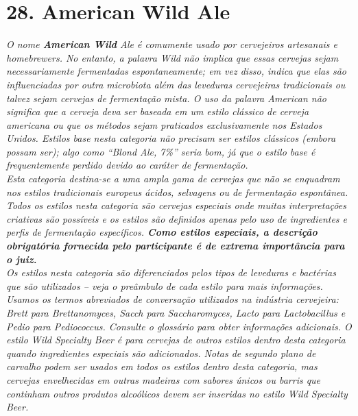 \section*{28. American Wild Ale}
\textit{O nome \textbf{American Wild} Ale é comumente usado por cervejeiros artesanais e homebrewers. No entanto, a palavra Wild não implica que essas cervejas sejam necessariamente fermentadas espontaneamente; em vez disso, indica que elas são influenciadas por outra microbiota além das leveduras cervejeiras tradicionais ou talvez sejam cervejas de fermentação mista. O uso da palavra American não significa que a cerveja deva ser baseada em um estilo clássico de cerveja americana ou que os métodos sejam praticados exclusivamente nos Estados Unidos. Estilos base nesta categoria não precisam ser estilos clássicos (embora possam ser); algo como “Blond Ale, 7\%” seria bom, já que o estilo base é frequentemente perdido devido ao caráter de fermentação.}\\
\textit{Esta categoria destina-se a uma ampla gama de cervejas que não se enquadram nos estilos tradicionais europeus ácidos, selvagens ou de fermentação espontânea. Todos os estilos nesta categoria são cervejas especiais onde muitas interpretações criativas são possíveis e os estilos são definidos apenas pelo uso de ingredientes e perfis de fermentação específicos. \textbf{Como estilos especiais, a descrição obrigatória fornecida pelo participante é de extrema importância para o juiz.}}\\
\textit{Os estilos nesta categoria são diferenciados pelos tipos de leveduras e bactérias que são utilizados – veja o preâmbulo de cada estilo para mais informações. Usamos os termos abreviados de conversação utilizados na indústria cervejeira: Brett para Brettanomyces, Sacch para Saccharomyces, Lacto para Lactobacillus e Pedio para Pediococcus. Consulte o glossário para obter informações adicionais. O estilo Wild Specialty Beer é para cervejas de outros estilos dentro desta categoria quando ingredientes especiais são adicionados. Notas de segundo plano de carvalho podem ser usados em todos os estilos dentro desta categoria, mas cervejas envelhecidas em outras madeiras com sabores únicos ou barris que continham outros produtos alcoólicos devem ser inseridas no estilo Wild Specialty Beer.}
